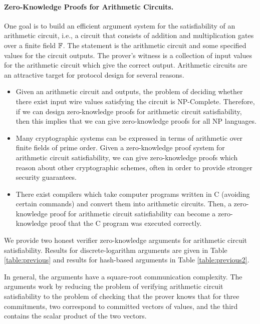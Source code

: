 \paragraph{Zero-Knowledge Proofs for Arithmetic Circuits.} One goal is to build an efficient argument system for the satisfiability of an arithmetic circuit, i.e., a circuit that consists of addition and multiplication gates over a finite field $\mathbb{F}$. The statement is the arithmetic circuit and some specified values for the circuit outputs. The prover's witness is a collection of input values for the arithmetic circuit which give the correct output. Arithmetic circuits are an attractive target for protocol design for several reasons.

\begin{itemize}
\item Given an arithmetic circuit and outputs, the problem of deciding whether there exist input wire values satisfying the circuit is NP-Complete. Therefore, if we can design zero-knowledge proofs for arithmetic circuit satisfiability, then this implies that we can give zero-knowledge proofs for all NP languages.
\item Many cryptographic systems can be expressed in terms of arithmetic over finite fields of prime order. Given a zero-knowledge proof system for arithmetic circuit satisfiability, we can give zero-knowledge proofs which reason about other cryptographic schemes, often in order to provide stronger security guarantees.
\item There exist compilers which take computer programs written in C \cite{PHGR13,WahbySRBW15} (avoiding certain commands) and convert them into arithmetic circuits. Then, a zero-knowledge proof for arithmetic circuit satisfiability can become a zero-knowledge proof that the C program was executed correctly.
\end{itemize}

We provide two honest verifier zero-knowledge arguments for arithmetic circuit satisfiability. Results for discrete-logarithm arguments are given in Table \ref{table:previous} and results for hash-based arguments in Table \ref{table:previous2}.

In general, the arguments have a square-root communication complexity. The arguments work by reducing the problem of verifying arithmetic circuit satisfiability to the problem of checking that the prover knows that for three commitments, two correspond to committed vectors of values, and the third contains the scalar product of the two vectors. 

